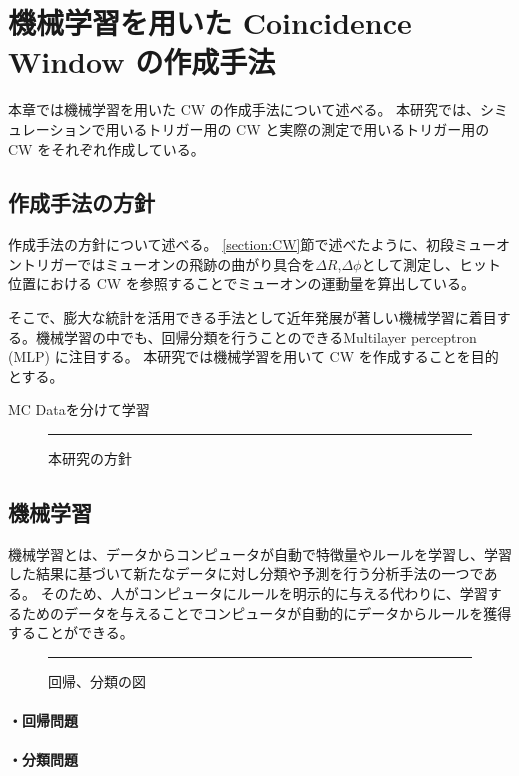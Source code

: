 \chapter{機械学習を用いた Coincidence Window の作成手法}
本章では機械学習を用いた CW の作成手法について述べる。
本研究では、シミュレーションで用いるトリガー用の CW と実際の測定で用いるトリガー用の CW をそれぞれ作成している。

\section{作成手法の方針}
作成手法の方針について述べる。
\ref{section:CW}節で述べたように、初段ミューオントリガーではミューオンの飛跡の曲がり具合を$\Delta R$,$\Delta \phi$として測定し、ヒット位置における CW を参照することでミューオンの運動量を算出している。


そこで、膨大な統計を活用できる手法として近年発展が著しい機械学習に着目する。機械学習の中でも、回帰分類を行うことのできるMultilayer perceptron (MLP) に注目する。
本研究では機械学習を用いて CW を作成することを目的とする。

MC Dataを分けて学習\\

\begin{figure}[tb]
  \centering
  \rule{8cm}{6cm}
  \caption{本研究の方針}
  \label{fig:fit_def}
\end{figure}

\section{機械学習}
機械学習とは、データからコンピュータが自動で特徴量やルールを学習し、学習した結果に基づいて新たなデータに対し分類や予測を行う分析手法の一つである。
そのため、人がコンピュータにルールを明示的に与える代わりに、学習するためのデータを与えることでコンピュータが自動的にデータからルールを獲得することができる。


\begin{figure}[tb]
  \centering
  \rule{8cm}{6cm}
  \caption{回帰、分類の図}
  \label{fig:fit_def}
\end{figure}

\subsubsection{・回帰問題}
\subsubsection{・分類問題}

